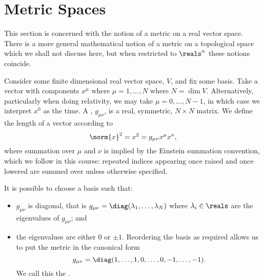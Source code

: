 \documentclass[fleqn]{NotesClass}
\begin{document}
    \section{Metric Spaces}
    \begin{rmk}
        This section is concerned with the notion of a metric on a real vector space.
        There is a more general mathematical notion of a metric on a topological space which we shall not discuss here, but when restricted to \(\reals^n\) these notions coincide.
    \end{rmk}

    Consider some finite dimensional real vector space, \(V\), and fix some basis.
    Take a vector with components \(x^\mu\) where \(\mu = 1, \dotsc, N\) where \(N = \dim V\).
    Alternatively, particularly when doing relativity, we may take \(\mu = 0, \dotsc, N - 1\), in which case we interpret \(x^0\) as the time.
    A , \(g_{\mu\nu}\), is a real, symmetric, \(N \times N\) matrix.
    We define the length of a vector according to
    \begin{equation}
        \norm{x}^2 = x^2 = g_{\mu\nu}x^\mu x^\nu,
    \end{equation}
    where summation over \(\mu\) and \(\nu\) is implied by the Einstein summation convention, which we follow in this course: repeated indices appearing once raised and once lowered are summed over unless otherwise specified.
    
    It is possible to choose a basis such that:
    \begin{itemize}
        \item \(g_{\mu\nu}\) is diagonal, that is \(g_{\mu\nu} = \diag(\lambda_1, \dotsc, \lambda_N)\) where \(\lambda_i \in \reals\) are the eigenvalues of \(g_{\mu\nu}\); and
        \item the eigenvalues are either \(0\) or \(\pm 1\).
        Reordering the basis as required allows us to put the metric in the canonical form
        \begin{equation}
            g_{\mu\nu} = \diag(1, \dotsc, 1, 0, \dotsc, 0, -1, \dotsc, -1).
        \end{equation}
        We call this the .
    \end{itemize}
\end{document}
